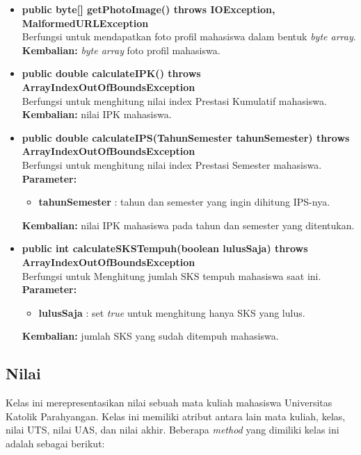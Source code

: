 \begin{itemize}
	\item \textbf{public byte[] getPhotoImage() throws IOException, MalformedURLException} \\
		Berfungsi untuk mendapatkan foto profil mahasiswa dalam bentuk \textit{byte array}. \\
		\textbf{Kembalian:} \textit{byte array} foto profil mahasiswa.	
		
		\item \textbf{public double calculateIPK() throws ArrayIndexOutOfBoundsException} \\
		Berfungsi untuk menghitung nilai index Prestasi Kumulatif mahasiswa. \\
		\textbf{Kembalian:} nilai IPK mahasiswa.	
		
		\item \textbf{public double calculateIPS(TahunSemester tahunSemester) throws ArrayIndexOutOfBoundsException} \\
		Berfungsi untuk menghitung nilai index Prestasi Semester mahasiswa. \\
		\textbf{Parameter:} 
		\begin{itemize}
			\item \textbf{tahunSemester} : tahun dan semester yang ingin dihitung IPS-nya.
		\end{itemize}
		\textbf{Kembalian:} nilai IPK mahasiswa pada tahun dan semester yang ditentukan.	
		
		\item \textbf{public int calculateSKSTempuh(boolean lulusSaja) throws ArrayIndexOutOfBoundsException} \\
		Berfungsi untuk Menghitung jumlah SKS tempuh mahasiswa saat ini. \\
		\textbf{Parameter:} 
		\begin{itemize}
			\item \textbf{lulusSaja} : set \textit{true} untuk menghitung hanya SKS yang lulus.
		\end{itemize}
		\textbf{Kembalian:} jumlah SKS yang sudah ditempuh mahasiswa.	
\end{itemize}

\subsection{Nilai}
Kelas ini merepresentasikan nilai sebuah mata kuliah mahasiswa Universitas Katolik Parahyangan. Kelas ini memiliki atribut antara lain mata kuliah, kelas, nilai UTS, nilai UAS, dan nilai akhir. Beberapa \textit{method} yang dimiliki kelas ini adalah sebagai berikut:

